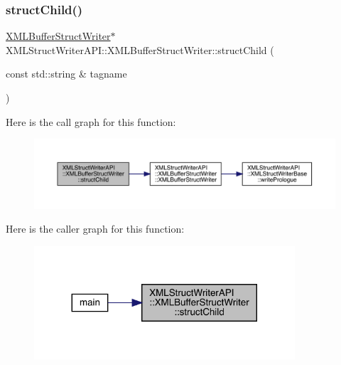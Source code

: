 \subsubsection{\texorpdfstring{structChild()}{structChild()}\hspace{0.1cm}{\footnotesize\ttfamily [1/3]}}
{\footnotesize\ttfamily \mbox{\hyperlink{classXMLStructWriterAPI_1_1XMLBufferStructWriter}{X\+M\+L\+Buffer\+Struct\+Writer}}$\ast$ X\+M\+L\+Struct\+Writer\+A\+P\+I\+::\+X\+M\+L\+Buffer\+Struct\+Writer\+::struct\+Child (\begin{DoxyParamCaption}\item[{const std\+::string \&}]{tagname }\end{DoxyParamCaption})\hspace{0.3cm}{\ttfamily [inline]}}

Here is the call graph for this function\+:\nopagebreak
\begin{figure}[H]
\begin{center}
\leavevmode
\includegraphics[width=350pt]{d2/d0a/classXMLStructWriterAPI_1_1XMLBufferStructWriter_a1c5689221a56527dfd86ac071db3a534_cgraph}
\end{center}
\end{figure}
Here is the caller graph for this function\+:
\nopagebreak
\begin{figure}[H]
\begin{center}
\leavevmode
\includegraphics[width=275pt]{d2/d0a/classXMLStructWriterAPI_1_1XMLBufferStructWriter_a1c5689221a56527dfd86ac071db3a534_icgraph}
\end{center}
\end{figure}
\mbox{\label{classXMLStructWriterAPI_1_1XMLBufferStructWriter_a1c5689221a56527dfd86ac071db3a534}} 
